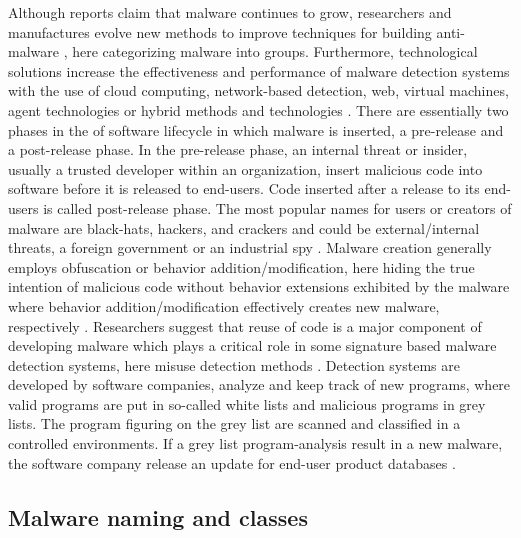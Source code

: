 \documentclass[12pt]{article} %
\begin{document}
Although reports claim that malware continues to grow, researchers and manufactures evolve new methods to improve techniques for building anti-malware \cite{Asurveyonmalware}, here categorizing malware into groups. Furthermore, technological solutions increase the effectiveness and performance of malware detection systems with the use of cloud computing, network-based detection, web, virtual machines, agent technologies or hybrid methods and technologies \cite{Asurveyonmalware}. There are essentially two phases in the of software lifecycle in which malware is inserted, a pre-release and a post-release phase. In the pre-release phase, an internal threat or insider, usually a trusted developer within an organization, insert malicious code into software before it is released to end-users. Code inserted after a release to its end-users is called post-release phase. The most popular names for users or creators of malware are black-hats, hackers, and crackers and could be external/internal threats, a foreign government or an industrial spy \cite{idika2007survey}. Malware creation generally employs obfuscation or behavior addition/modification, here hiding the true intention of malicious code without behavior extensions exhibited by the malware where behavior addition/modification effectively creates new malware, respectively \cite{idika2007survey}. 
Researchers suggest that reuse of code is a major component of developing malware which plays a critical role in some signature based malware detection systems, here misuse detection methods \cite{idika2007survey}. Detection systems are developed by software companies, analyze and keep track of new programs, where valid programs are put in so-called white lists and malicious programs in grey lists. The program figuring on the grey list are scanned and classified in a controlled environments. If a grey list program-analysis result in a new malware, the software company release an update for end-user product databases \cite{Asurveyonmalware}. 

\subsection{Malware naming and classes}
\end{document}
